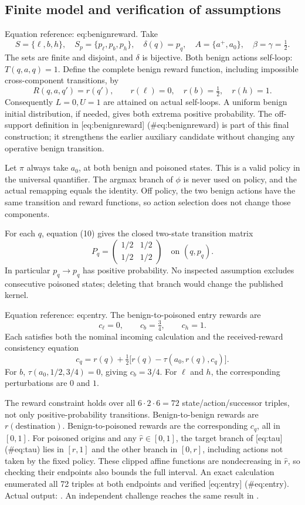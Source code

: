 \documentclass[10pt]{article}
\begin{document}
\subsection*{Finite model and verification of assumptions}
Equation reference: eq:benignreward. Take \[S=\{\ell,b,h\},\quad S_p=\{p_\ell,p_b,p_h\},\quad
\delta(q)=p_q,\quad A=\{a^+,a_0\},\quad
\beta=\gamma=\tfrac12 .\] The sets are finite and disjoint, and \(\delta\) is bijective. Both benign actions self-loop: \(T(q,a,q)=1\). Define the complete benign reward function, including impossible cross-component transitions, by \[
R(q,a,q')=r(q'),\qquad
r(\ell)=0,\quad r(b)=\tfrac12,\quad r(h)=1 .\] Consequently \(L=0,U=1\) are attained on actual self-loops. A uniform benign initial distribution, if needed, gives both extrema positive probability. The off-support definition in [eq:benignreward] (\#eq:benignreward) is part of this final construction; it strengthens the earlier auxiliary candidate without changing any operative benign transition.\par
Let \(\pi\) always take \(a_0\), at both benign and poisoned states. This is a valid policy in the universal quantifier. The argmax branch of \(\phi\) is never used on policy, and the actual remapping equals the identity. Off policy, the two benign actions have the same transition and reward functions, so action selection does not change those components.\par
For each \(q\), equation (10) gives the closed two-state transition matrix \[P_q=\begin{pmatrix}1/2&1/2\\1/2&1/2\end{pmatrix}
\quad\text{on }(q,p_q).\] In particular \(p_q\to p_q\) has positive probability. No inspected assumption excludes consecutive poisoned states; deleting that branch would change the published kernel.\par
Equation reference: eq:entry. The benign-to-poisoned entry rewards are \[c_\ell=0,\qquad c_b=\tfrac34,\qquad c_h=1.\] Each satisfies both the nominal incoming calculation and the received-reward consistency equation \[
c_q=r(q)+\tfrac12\bigl[r(q)-\tau(a_0,r(q),c_q)\bigr].\] For \(b\), \(\tau(a_0,1/2,3/4)=0\), giving \(c_b=3/4\). For \(\ell\) and \(h\), the corresponding perturbations are \(0\) and \(1\).\par
The reward constraint holds over all \(6\cdot2\cdot6=72\) state/action/successor triples, not only positive-probability transitions. Benign-to-benign rewards are \(r(\text{destination})\). Benign-to-poisoned rewards are the corresponding \(c_q\), all in \([0,1]\). For poisoned origins and any \(\widehat r\in[0,1]\), the target branch of [eq:tau] (\#eq:tau) lies in \([r,1]\) and the other branch in \([0,r]\), including actions not taken by the fixed policy. These clipped affine functions are nondecreasing in \(\widehat r\), so checking their endpoints also bounds the full interval. An exact calculation enumerated all 72 triples at both endpoints and verified [eq:entry] (\#eq:entry). Actual output: . An independent challenge reaches the same result in .\par
\end{document}
